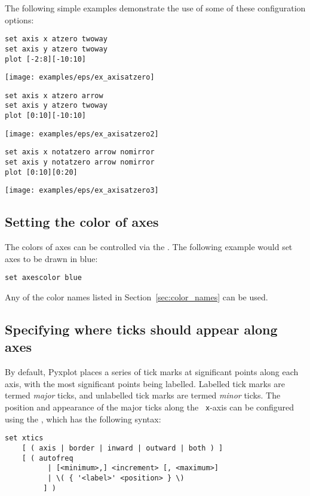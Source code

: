 The following simple examples demonstrate the use of some of these configuration options:
\begin{verbatim}
set axis x atzero twoway
set axis y atzero twoway
plot [-2:8][-10:10]
\end{verbatim}

\centerline{\texttt{[image: examples/eps/ex\_axisatzero]}}

\begin{verbatim}
set axis x atzero arrow
set axis y atzero twoway
plot [0:10][-10:10]
\end{verbatim}

\centerline{\texttt{[image: examples/eps/ex\_axisatzero2]}}

\begin{verbatim}
set axis x notatzero arrow nomirror
set axis y notatzero arrow nomirror
plot [0:10][0:20]
\end{verbatim}

\centerline{\texttt{[image: examples/eps/ex\_axisatzero3]}}

\subsection{Setting the color of axes}

The colors of axes can be controlled
via the .  The following example would set axes to be
drawn in blue:

\begin{verbatim}
set axescolor blue
\end{verbatim}

\noindent Any of the color names listed in Section~\ref{sec:color_names} can
be used.

\subsection{Specifying where ticks should appear along axes}

By default, Pyxplot places a series of tick marks at significant points along
each axis, with the most significant points being labelled.  Labelled tick
marks are termed {\it major} ticks, and unlabelled tick marks are termed {\it
minor} ticks.  The position and appearance of the major ticks along the {\tt
x}-axis can be configured using the , which has the
following syntax:

\begin{verbatim}
set xtics
    [ ( axis | border | inward | outward | both ) ]
    [ ( autofreq
          | [<minimum>,] <increment> [, <maximum>]
          | \( { '<label>' <position> } \)
         ] )
\end{verbatim}

